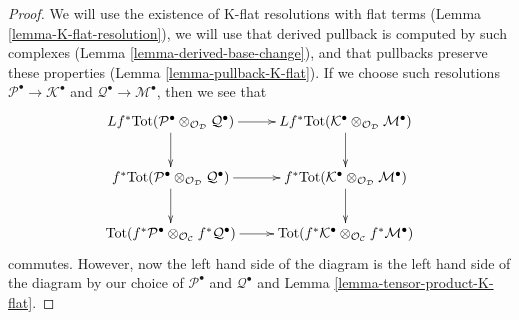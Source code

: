 \documentclass[10pt,a4paper]{amsart}
\theoremstyle{plain}
\theoremstyle{definition}
\theoremstyle{remark}
\numberwithin{equation}{subsection}
\begin{document}
\begin{proof}
We will use the existence of K-flat resolutions with flat terms
(Lemma \ref{lemma-K-flat-resolution}), we will use that derived pullback
is computed by such complexes (Lemma \ref{lemma-derived-base-change}),
and that pullbacks preserve these properties
(Lemma \ref{lemma-pullback-K-flat}). If we choose such
resolutions $\mathcal{P}^\bullet \to \mathcal{K}^\bullet$
and $\mathcal{Q}^\bullet \to \mathcal{M}^\bullet$, then
we see that
$$
\xymatrix{
Lf^*\text{Tot}(\mathcal{P}^\bullet
\otimes_{\mathcal{O}_\mathcal{D}}
\mathcal{Q}^\bullet) \ar[r] \ar[d] &
Lf^*\text{Tot}(\mathcal{K}^\bullet
\otimes_{\mathcal{O}_\mathcal{D}}
\mathcal{M}^\bullet) \ar[d] \\
f^*\text{Tot}(\mathcal{P}^\bullet
\otimes_{\mathcal{O}_\mathcal{D}}
\mathcal{Q}^\bullet) \ar[d] \ar[r] &
f^*\text{Tot}(\mathcal{K}^\bullet
\otimes_{\mathcal{O}_\mathcal{D}}
\mathcal{M}^\bullet) \ar[d] \\
\text{Tot}(f^*\mathcal{P}^\bullet \otimes_{\mathcal{O}_\mathcal{C}}
f^*\mathcal{Q}^\bullet) \ar[r] &
\text{Tot}(f^*\mathcal{K}^\bullet \otimes_{\mathcal{O}_\mathcal{C}}
f^*\mathcal{M}^\bullet)
}
$$
commutes. However, now the left hand side of the diagram
is the left hand side of the diagram by our choice of
$\mathcal{P}^\bullet$ and $\mathcal{Q}^\bullet$ and
Lemma \ref{lemma-tensor-product-K-flat}.
\end{proof}
\end{document}
